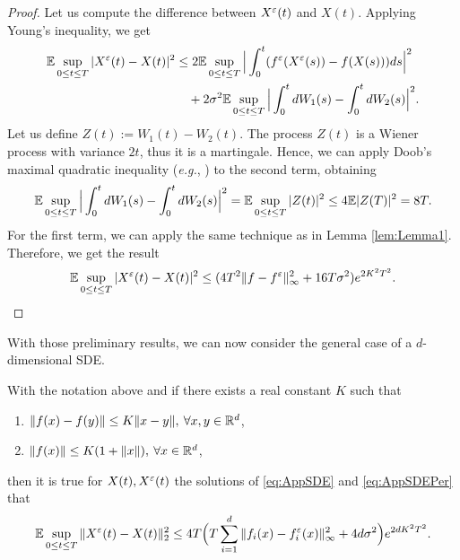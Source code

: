 \begin{proof} Let us compute the difference between $X^\varepsilon(t)$ and $X(t)$. Applying Young's inequality, we get
\begin{equation*}
\begin{aligned}
	\mathbb{E} \sup_{0 \leq t \leq T} |X^\varepsilon(t) - X(t)|^2 &\leq 2\mathbb{E} \sup_{0 \leq t \leq T}\Big|\int_0^t (f^\varepsilon (X^\varepsilon(s)) - f(X(s)))ds \Big|^2 \\
		&\quad + 2\sigma^2 \mathbb{E} \sup_{0 \leq t \leq T} \Big|\int_0^t dW_1(s) - \int_0^t dW_2(s)  \Big|^2.
\end{aligned}
\end{equation*}
Let us define $Z(t) := W_1(t) - W_2(t)$. The process $Z(t)$ is a Wiener process with variance $2t$, thus it is a martingale. Hence, we can apply Doob's maximal quadratic inequality (\textit{e.g.}, \cite[Page 11]{Protter2004}) to the second term, obtaining
\begin{equation*}
	\mathbb{E} \sup_{0 \leq t \leq T} \Big|\int_0^t dW_1(s) - \int_0^t dW_2(s)  \Big|^2 = \mathbb{E} \sup_{0 \leq t \leq T} | Z(t) |^2 \leq 4 \mathbb{E} |Z(T)|^2 = 8T.
\end{equation*}
For the first term, we can apply the same technique as in Lemma \ref{lem:Lemma1}. Therefore, we get the result
\begin{equation*}
	\mathbb{E} \sup_{0 \leq t \leq T} |X^\varepsilon(t) - X(t)|^2 \leq (4T^2 \|f - f^\varepsilon\|_{\infty}^2 + 16T\sigma^2) e^{2K^2T^2}.
\end{equation*}
\end{proof}
\noindent With those preliminary results, we can now consider the general case of a $d$-dimensional SDE.
\begin{theorem}\label{th:Prop} With the notation above and if there exists a real constant $K$ such that
\begin{enumerate}
	\item $\|f(x) - f(y)\| \leq K\|x - y\|, \: \forall x,y \in \mathbb{R}^d$,
	\item $\|f(x)\| \leq K(1 + \|x\|), \: \forall x \in \mathbb{R}^d$,
\end{enumerate}
then it is true for $X(t), X^\varepsilon(t)$ the solutions of \eqref{eq:AppSDE} and \eqref{eq:AppSDEPer} that 
\begin{equation}\label{eq:Proposition}
	\mathbb{E} \sup_{0\leq t\leq T} \| X^\varepsilon(t) - X(t) \|_2^2 \leq 4T\Big(T \sum_{i=1}^d \|f_i(x) - f_i^\varepsilon(x)\|_\infty^2 + 4d\sigma^2\Big)e^{2dK^2T^2}.
\end{equation}
\end{theorem}

